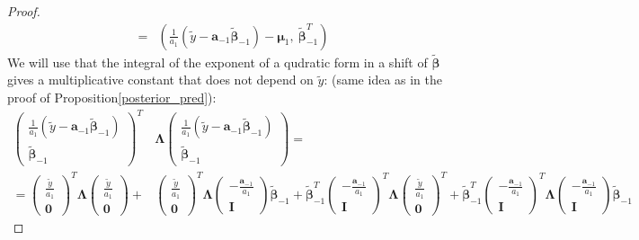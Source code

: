 \documentclass[10pt,fleqn]{amsart}
\theoremstyle{definition}
\theoremstyle{remark}
\numberwithin{equation}{section}
\newcommand{\aaa}{\boldsymbol{a}}
\newcommand{\bbeta}{\boldsymbol{\beta}}
\newcommand{\mmu}{\boldsymbol{\mu}}
\newcommand{\LLambda}{\boldsymbol{\Lambda}}
\newcommand{\bbetatilde}{\widetilde{\bbeta}}
\newcommand{\ytilde}{\widetilde{y}}
\begin{document}
\begin{proof}
\begin{equation*}
\begin{split}
    =&\left(\frac{1}{a_1}\left(\ytilde-\aaa_{-1}\bbetatilde_{-1}\right)-\mmu_1,\ \bbetatilde_{-1}^T\right)
\end{split}\end{equation*}
We will use that the integral of the exponent of a qudratic form in a shift of $\bbetatilde$ gives a multiplicative constant that
does not depend on $\ytilde$:
(same idea as in the proof of Proposition\ref{posterior_pred}):
\begin{equation*}\begin{split}
    \left(\begin{matrix}\frac 1{a_1}\left(\ytilde-\aaa_{-1}\bbetatilde_{-1}\right)\\\bbetatilde_{-1}\end{matrix}\right)^T
    &\LLambda
    \left(\begin{matrix}\frac 1{a_1}\left(\ytilde-\aaa_{-1}\bbetatilde_{-1}\right)\\\bbetatilde_{-1}\end{matrix}\right)=\\
    =\left(\begin{matrix}\frac \ytilde{a_1}\\\boldsymbol{0}\end{matrix}\right)^T
    \LLambda
    \left(\begin{matrix}\frac \ytilde{a_1}\\\boldsymbol{0}\end{matrix}\right)+
    &\left(\begin{matrix}\frac \ytilde{a_1}\\\boldsymbol{0}\end{matrix}\right)^T
    \LLambda
    \left(\begin{matrix}-\frac {\aaa_{-1}}{a_1}\\\boldsymbol{I}\end{matrix}\right)\bbetatilde_{-1}+
    \bbetatilde_{-1}^T\left(\begin{matrix}-\frac {\aaa_{-1}}{a_1}\\\boldsymbol{I}\end{matrix}\right)^T
    \LLambda
    \left(\begin{matrix}\frac \ytilde{a_1}\\\boldsymbol{0}\end{matrix}\right)^T+
    \bbetatilde_{-1}^T\left(\begin{matrix}-\frac {\aaa_{-1}}{a_1}\\\boldsymbol{I}\end{matrix}\right)^T
    \LLambda\left(\begin{matrix}-\frac {\aaa_{-1}}{a_1}\\\boldsymbol{I}\end{matrix}\right)\bbetatilde_{-1}

\end{split}
\end{equation*}
\end{proof}
\end{document}
